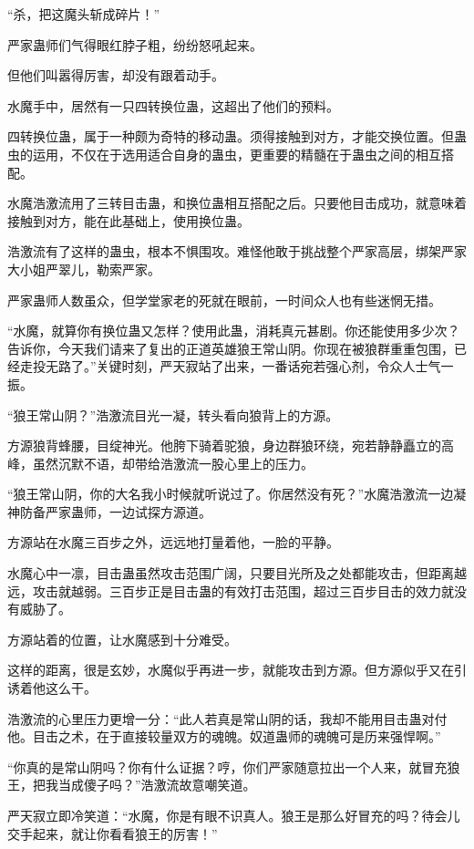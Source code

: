 \begin{this_body}
“杀，把这魔头斩成碎片！”

严家蛊师们气得眼红脖子粗，纷纷怒吼起来。

但他们叫嚣得厉害，却没有跟着动手。

水魔手中，居然有一只四转换位蛊，这超出了他们的预料。

四转换位蛊，属于一种颇为奇特的移动蛊。须得接触到对方，才能交换位置。但蛊虫的运用，不仅在于选用适合自身的蛊虫，更重要的精髓在于蛊虫之间的相互搭配。

水魔浩激流用了三转目击蛊，和换位蛊相互搭配之后。只要他目击成功，就意味着接触到对方，能在此基础上，使用换位蛊。

浩激流有了这样的蛊虫，根本不惧围攻。难怪他敢于挑战整个严家高层，绑架严家大小姐严翠儿，勒索严家。

严家蛊师人数虽众，但学堂家老的死就在眼前，一时间众人也有些迷惘无措。

“水魔，就算你有换位蛊又怎样？使用此蛊，消耗真元甚剧。你还能使用多少次？告诉你，今天我们请来了复出的正道英雄狼王常山阴。你现在被狼群重重包围，已经走投无路了。”关键时刻，严天寂站了出来，一番话宛若强心剂，令众人士气一振。

“狼王常山阴？”浩激流目光一凝，转头看向狼背上的方源。

方源狼背蜂腰，目绽神光。他胯下骑着驼狼，身边群狼环绕，宛若静静矗立的高峰，虽然沉默不语，却带给浩激流一股心里上的压力。

“狼王常山阴，你的大名我小时候就听说过了。你居然没有死？”水魔浩激流一边凝神防备严家蛊师，一边试探方源道。

方源站在水魔三百步之外，远远地打量着他，一脸的平静。

水魔心中一凛，目击蛊虽然攻击范围广阔，只要目光所及之处都能攻击，但距离越远，攻击就越弱。三百步正是目击蛊的有效打击范围，超过三百步目击的效力就没有威胁了。

方源站着的位置，让水魔感到十分难受。

这样的距离，很是玄妙，水魔似乎再进一步，就能攻击到方源。但方源似乎又在引诱着他这么干。

浩激流的心里压力更增一分：“此人若真是常山阴的话，我却不能用目击蛊对付他。目击之术，在于直接较量双方的魂魄。奴道蛊师的魂魄可是历来强悍啊。”

“你真的是常山阴吗？你有什么证据？哼，你们严家随意拉出一个人来，就冒充狼王，把我当成傻子吗？”浩激流故意嘲笑道。

严天寂立即冷笑道：“水魔，你是有眼不识真人。狼王是那么好冒充的吗？待会儿交手起来，就让你看看狼王的厉害！”


\end{this_body}
